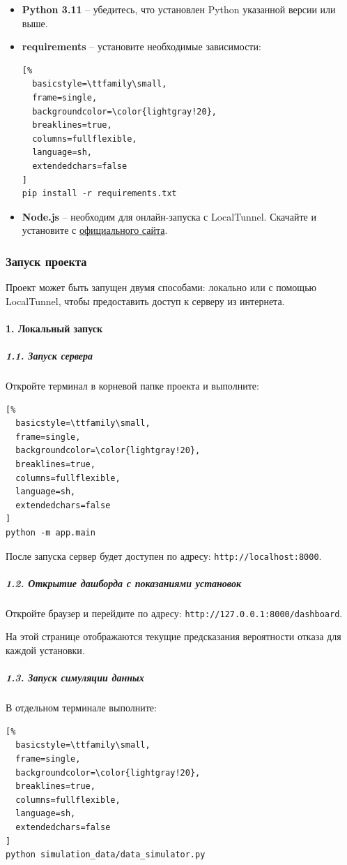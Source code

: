 \documentclass[a4paper,12pt]{article}
\begin{document}
\begin{flushleft}
\begin{itemize}
    \item \textbf{Python 3.11} – убедитесь, что установлен Python указанной версии или выше.
    \item \textbf{requirements} – установите необходимые зависимости:
\begin{lstlisting}[%
  basicstyle=\ttfamily\small,
  frame=single,
  backgroundcolor=\color{lightgray!20},
  breaklines=true,
  columns=fullflexible,
  language=sh,
  extendedchars=false
]
pip install -r requirements.txt
\end{lstlisting}
    \item \textbf{Node.js} – необходим для онлайн-запуска с LocalTunnel. Скачайте и установите с \href{https://nodejs.org/}{официального сайта}.
\end{itemize}

\subsubsection{Запуск проекта}

Проект может быть запущен двумя способами: локально или с помощью LocalTunnel, чтобы предоставить доступ к серверу из интернета.

\paragraph{1. Локальный запуск}

\subparagraph{1.1. Запуск сервера}

Откройте терминал в корневой папке проекта и выполните:
\begin{lstlisting}[%
  basicstyle=\ttfamily\small,
  frame=single,
  backgroundcolor=\color{lightgray!20},
  breaklines=true,
  columns=fullflexible,
  language=sh,
  extendedchars=false
]
python -m app.main
\end{lstlisting}

После запуска сервер будет доступен по адресу: \texttt{http://localhost:8000}.

\subparagraph{1.2. Открытие дашборда с показаниями установок}

Откройте браузер и перейдите по адресу: \texttt{http://127.0.0.1:8000/dashboard}.

На этой странице отображаются текущие предсказания вероятности отказа для каждой установки.

\subparagraph{1.3. Запуск симуляции данных}

В отдельном терминале выполните:
\begin{lstlisting}[%
  basicstyle=\ttfamily\small,
  frame=single,
  backgroundcolor=\color{lightgray!20},
  breaklines=true,
  columns=fullflexible,
  language=sh,
  extendedchars=false
]
python simulation_data/data_simulator.py
\end{lstlisting}


\end{flushleft}
\end{document}
